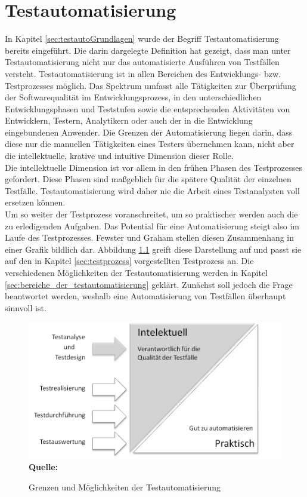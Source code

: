 \chapter{Testautomatisierung}
\label{sec:testautomatisierung}
In Kapitel \ref{sec:testautoGrundlagen} wurde der Begriff Testautomatisierung bereits eingeführt. Die darin dargelegte Definition hat gezeigt, dass man unter Testautomatisierung nicht nur das automatisierte Ausführen von Testfällen versteht.
Testautomatisierung ist in allen Bereichen des Entwicklungs- bzw. Testprozesses möglich.
\glqq Das Spektrum umfasst alle Tätigkeiten zur Überprüfung der Softwarequalität im Entwicklungsprozess, in den unterschiedlichen Entwicklungsphasen und Teststufen sowie die entsprechenden Aktivitäten von Entwicklern, Testern, Analytikern oder auch der in die Entwicklung eingebundenen Anwender. Die Grenzen der Automatisierung liegen darin, dass diese nur die manuellen Tätigkeiten eines Testers übernehmen kann, nicht aber die intellektuelle, krative und intuitive Dimension dieser Rolle.\grqq\ \cite[S.7]{seidl_basiswissen_2012} \\
Die intellektuelle Dimension ist vor allem in den frühen Phasen des Testprozesses gefordert. Diese Phasen sind maßgeblich für die spätere Qualität der einzelnen Testfälle. Testautomatisierung wird daher nie die Arbeit eines Testanalysten voll ersetzen können.\\
Um so weiter der Testprozess voranschreitet, um so praktischer werden auch die zu erledigenden Aufgaben. Das Potential für eine Automatisierung steigt also im Laufe des Testprozesses.
Fewster und Graham \cite[vgl. S.18]{fewster_software_1999} stellen diesen Zusammenhang in einer Grafik bildlich dar.  Abbildung \ref{fig:intellektuellVsPraktisch} greift diese Darstellung auf und passt sie auf den in Kapitel \ref{sec:testprozess} vorgestellten Testprozess an. Die verschiedenen Möglichkeiten der Testautomatisierung werden in Kapitel \ref{sec:bereiche_der_testautomatisierung} geklärt. Zunächst soll jedoch die Frage beantwortet werden, weshalb eine Automatisierung von Testfällen überhaupt sinnvoll ist.

\begin{figure}[htb]
  \centering  
  \includegraphics[scale=1]{img/intelektuellVsPraktisch.png}\\
  \footnotesize\sffamily\textbf{Quelle:} \cite[vgl. S.18]{fewster_software_1999}
  \caption{Grenzen und Möglichkeiten der Testautomatisierung}
  \label{fig:intellektuellVsPraktisch}
\end{figure}

